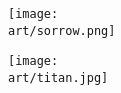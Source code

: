 \begin{multicols}{2}
\bigbreak

\texttt{[image: \\art/sorrow.png]}

    \begin{center}
        \texttt{[image: \\art/titan.jpg]}
    \end{center}
    
\end{multicols}
